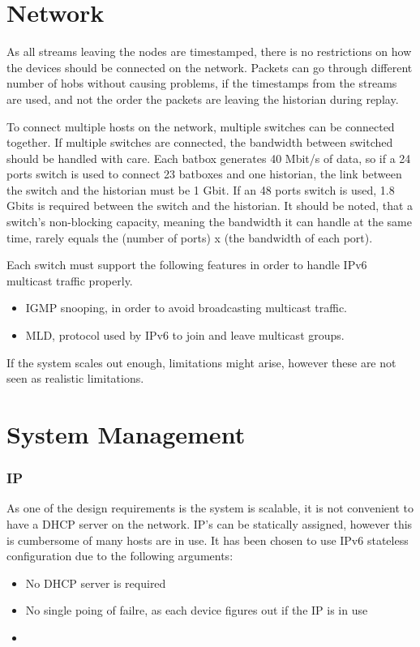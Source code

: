 \section{Network}
As all streams leaving the nodes are timestamped, there is no restrictions on how the devices should be connected on the network. Packets can go through different number of hobs without causing problems, if the timestamps from the streams are used, and not the order the packets are leaving the historian during replay.

To connect multiple hosts on the network, multiple switches can be connected together. If multiple switches are connected, the bandwidth between switched should be handled with care. Each batbox generates 40 Mbit/s of data, so if a 24 ports switch is used to connect 23 batboxes and one historian, the link between the switch and the historian must be 1 Gbit. If an 48 ports switch is used, 1.8 Gbits is required between the switch and the historian. It should be noted, that a switch's non-blocking capacity, meaning the bandwidth it can handle at the same time, rarely equals the (number of ports) x (the bandwidth of each port).

Each switch must support the following features in order to handle IPv6 multicast traffic properly.

\begin{itemize}
	 \item IGMP snooping, in order to avoid broadcasting multicast traffic.
	 \item MLD, protocol used by IPv6 to join and leave multicast groups.
\end{itemize}

If the system scales out enough, limitations might arise, however these are not seen as realistic limitations.

\section{System Management}
\subsubsection{IP}
As one of the design requirements is the system is scalable, it is not convenient to have a DHCP server on the network. IP's can be statically assigned, however this is cumbersome of many hosts are in use. It has been chosen to use IPv6 stateless configuration due to the following arguments:
\begin{itemize}
	\item No DHCP server is required
	\item No single poing of failre, as each device figures out if the IP is in use
	\item 
\end{itemize}

